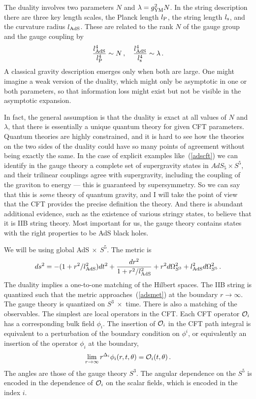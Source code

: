 \documentclass[12pt]{article}
\newcommand{\be}{\begin{equation}}
\newcommand{\ee}{\end{equation}}
\begin{document}
The duality involves two parameters $N$ and $\lambda = g_{\rm YM}^2N$.  In the string description there are three key length scales, the Planck length $l_{\rm P}$, the string length $l_{\rm s}$, and the curvature radius $l_{\rm AdS}$.  These are related to the rank $N$ of the gauge group and the gauge coupling by
\be
\frac{l_{\rm AdS}^4}{l_{\rm P}^4} \sim N \,,  \quad \frac{l_{\rm AdS}^4}{l_{\rm s}^4} \sim \lambda  \,. \label{ratio}
\ee
A classical gravity description emerges only when both are large.  One might imagine a weak version of the duality, which might only be asymptotic in one or both parameters, so that information loss might exist but not be visible in the asymptotic expansion.  

In fact, the general assumption is that the duality is exact at all values of $N$ and $\lambda$, that there is essentially a unique quantum theory for given CFT parameters.  Quantum theories are highly constrained, and it is hard to see how the theories on the two sides of the duality could have so many points of agreement without being exactly the same.  In the case of explicit examples like~(\ref{adscft}) we can identify in the gauge theory a complete set of supergravity states in $AdS_5 \times S^5$, and their trilinear couplings agree with supergravity, including the coupling of the graviton to energy --- this is guaranteed by supersymmetry.  So we can say that this is {\it some} theory of quantum gravity, and  I will take the point of view that the CFT provides the precise definition the theory.  And there is abundant additional evidence, such as the existence of various stringy states, to believe that it is IIB string theory.  Most important for us, the gauge theory contains states with the right properties to be AdS black holes.  


We will be using global AdS$\ \times\  S^5$.  The  metric is
\be
ds^2 = -(1 + r^2/l_{\rm AdS}^2) dt^2 + \frac{ dr^2}{1 + r^2/l_{\rm AdS}^2} + r^2 d\Omega^2_{S^3} + l_{\rm AdS}^2 d\Omega^2_{S^5} \,. \label{adsmet}
\ee
The duality implies a one-to-one matching of the Hilbert spaces.  The IIB string is quantized such that the metric approaches~(\ref{adsmet}) at the boundary $r \to \infty$.  The gauge theory is quantized on $S^3\ \times$ time.  There is also a matching of the observables.  The simplest are local operators in the CFT.  Each CFT operator ${\cal O}_i$ has a corresponding bulk field $\phi_i$.  The insertion of ${\cal O}_i$  in the CFT path integral is equivalent to a perturbation of the boundary condition on $\phi^i$, or equivalently an insertion of the operator $\phi_i$ at the boundary,
\be
\lim_{r \to \infty} r^{\Delta_i} \phi_i(r, t, \theta) = {\cal O}_i(t,\theta) \,.  \label{extrap}
\ee
The angles are those of the gauge theory $S^3$.  The angular dependence on the $S^5$ is encoded in the dependence of ${\cal O}_i$ on the scalar fields, which is encoded in the index $i$.
\end{document}
